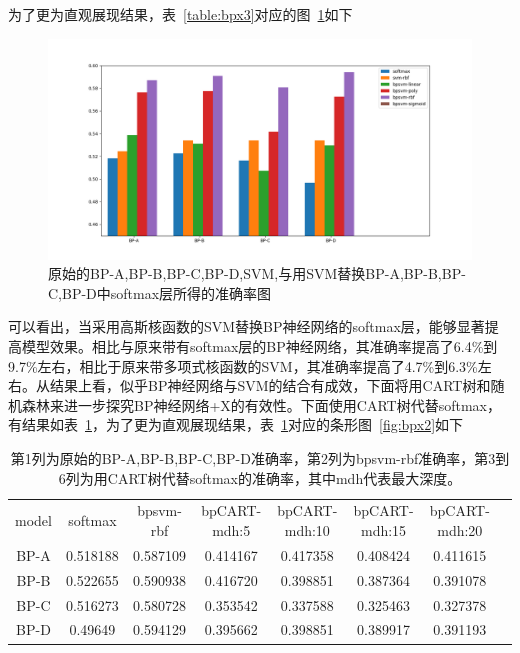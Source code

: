 为了更为直观展现结果，表~\ref{table:bpx3}对应的图~\ref{fig:bpx1}如下
\begin{figure}[htb]
\centering
\includegraphics[scale=0.5]{../figures/NN_svm1.png} 
\caption{原始的BP-A,BP-B,BP-C,BP-D,SVM,与用SVM替换BP-A,BP-B,BP-C,BP-D中softmax层所得的准确率图}
\label{fig:bpx1}
\end{figure}

可以看出，当采用高斯核函数的SVM替换BP神经网络的softmax层，能够显著提高模型效果。相比与原来带有softmax层的BP神经网络，其准确率提高了6.4\%到9.7\%左右，相比于原来带多项式核函数的SVM，其准确率提高了4.7\%到6.3\%左右。从结果上看，似乎BP神经网络与SVM的结合有成效，下面将用CART树和随机森林来进一步探究BP神经网络+X的有效性。下面使用CART树代替softmax，有结果如表~\ref{table:bpx4}，为了更为直观展现结果，表~\ref{table:bpx4}对应的条形图~\ref{fig:bpx2}如下
\begin{table}[htb]
\centering
\caption{第1列为原始的BP-A,BP-B,BP-C,BP-D准确率，第2列为bpsvm-rbf准确率，第3到6列为用CART树代替softmax的准确率，其中mdh代表最大深度。}
\begin{tabular}{cccccccc}
\toprule[2pt]
model  & softmax & bpsvm-rbf & bpCART-mdh:5 & bpCART-mdh:10 & bpCART-mdh:15 & bpCART-mdh:20\\ 
BP-A & 0.518188 & 0.587109 & 0.414167 & 0.417358 & 0.408424 & 0.411615\\ 
BP-B & 0.522655 & 0.590938 & 0.416720 & 0.398851 & 0.387364 & 0.391078\\ 
BP-C & 0.516273 & 0.580728 & 0.353542 & 0.337588 & 0.325463 & 0.327378\\ 
BP-D & 0.49649 & 0.594129 & 0.395662 & 0.398851 & 0.389917 & 0.391193\\ 
\bottomrule[2pt]
\end{tabular} 
\label{table:bpx4}
\end{table}

